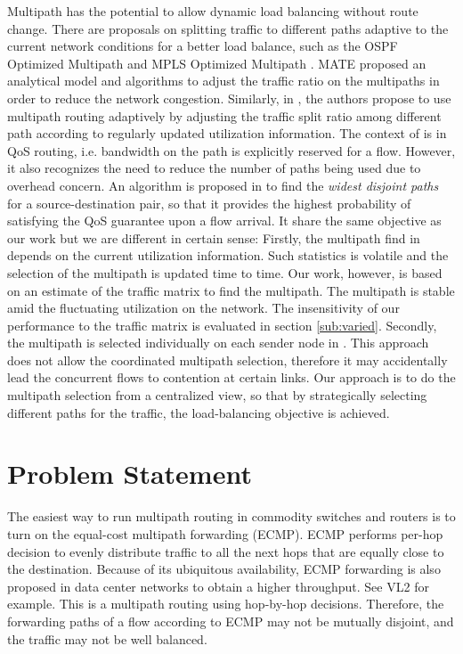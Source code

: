 \documentclass[conference]{IEEEtran}
\begin{document}
Multipath has the potential to allow dynamic load balancing without route
change. There are proposals on splitting traffic to different paths adaptive to
the current network conditions for a better load balance, such as the OSPF
Optimized Multipath \cite{ospfomp} and MPLS Optimized Multipath \cite{mplsomp}. 
MATE \cite{ejlw01} proposed an analytical model and algorithms to adjust the
traffic ratio on the multipaths in order to reduce the network congestion.
Similarly, in \cite{nzd04}, the authors propose to use multipath routing
adaptively by adjusting the traffic split ratio among different path
according to regularly updated utilization information. The context of
\cite{nzd04} is in QoS routing, i.e. bandwidth on the path is explicitly
reserved for a flow. However, it also recognizes the need to reduce the number
of paths being used due to overhead concern. An algorithm is proposed in
\cite{nzd04} to find the \emph{widest disjoint paths} for a source-destination
pair, so that it provides the highest probability of satisfying the QoS
guarantee upon a flow arrival. It share the same objective as our work but we
are different in certain sense: Firstly, the multipath find in \cite{nzd04}
depends on the current utilization information. Such statistics is volatile and
the selection of the multipath is updated time to time. Our work, however, is
based on an estimate of the traffic matrix to find the multipath. The multipath
is stable amid the fluctuating utilization on the network. The insensitivity of
our performance to the traffic matrix is evaluated in section \ref{sub:varied}.
Secondly, the multipath is selected individually on each sender node in
\cite{nzd04}. This approach does not allow the coordinated multipath selection,
therefore it may accidentally lead the concurrent flows to contention at
certain links. Our approach is to do the multipath selection from a centralized
view, so that by strategically selecting different paths for the traffic, the
load-balancing objective is achieved.

\section{Problem Statement}\label{sec:problem}

The easiest way to run multipath routing in commodity switches and routers is
to turn on the equal-cost multipath forwarding (ECMP). ECMP performs per-hop
decision to evenly distribute traffic to all the next hops that are equally
close to the destination. Because of its ubiquitous availability, ECMP
forwarding is also proposed in data center networks to obtain a higher
throughput. See VL2 \cite{gjkklmps09} for example. This is a multipath routing
using hop-by-hop decisions. Therefore, the forwarding paths of a flow according
to ECMP may not be mutually disjoint, and the traffic may not be well balanced.
\end{document}
